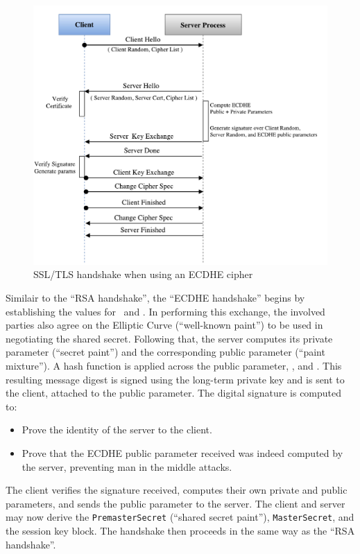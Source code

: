\documentclass[../../main.tex]{subfiles}
\begin{document}
\begin{figure}[H]
  \centering
  \includegraphics[scale=0.4]{images/EC-DHE-Handshake-pristine.pdf}
  \caption[``ECDHE handshake'']{SSL/TLS handshake when using an ECDHE
    cipher}
  \label{fig:ecdhe-pristine}
\end{figure}

Similair to the ``RSA handshake'', the ``ECDHE handshake'' begins by
establishing the values for \crandom~and \srandom. In performing this
exchange, the involved parties also agree on the Elliptic Curve
(``well-known paint'') to be used in negotiating the shared secret.
Following that, the server computes its private parameter (``secret
paint'') and the corresponding public parameter (``paint mixture''). A
hash function is applied across the public parameter, \srandom, and
\crandom. This resulting message digest is signed using the long-term
private key and is sent to the client, attached to the public
parameter. The digital signature is computed to:
\begin{itemize}
  \item Prove the identity of the server to the client.
  \item Prove that the ECDHE public parameter received was indeed
    computed by the server, preventing man in the middle attacks. 
\end{itemize}
The client verifies the signature received, computes their own private
and public parameters, and sends the public parameter to the server.
The client and server may now derive the \texttt{PremasterSecret}
(``shared secret paint''), \texttt{MasterSecret}, and the session key
block. The handshake then proceeds in the same way as the ``RSA
handshake''.
\end{document}
